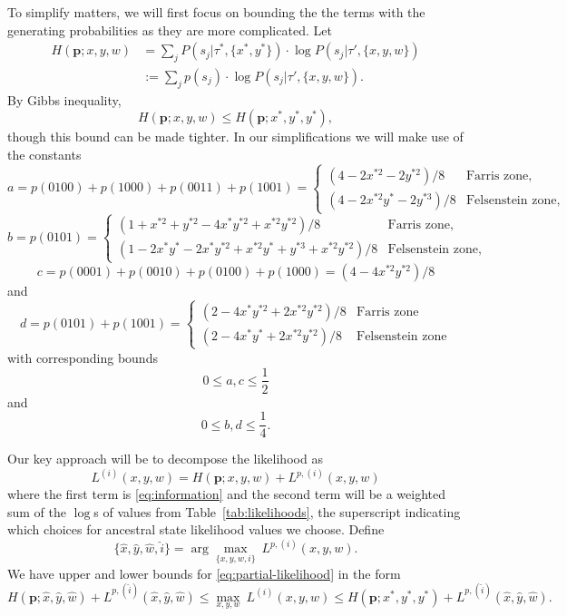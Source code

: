 \documentclass[a4paper]{article}
\begin{document}
To simplify matters, we will first focus on bounding the the terms with the generating probabilities as they are more complicated.
Let
\begin{align}
\label{eq:information}
H(\mathbf{p};x, y, w) &= \sum_{j} P(s_j | \tau^*, \{x^*,y^*\}) \cdot \log P(s_j | \tau', \{x,y,w\}) \nonumber \\ 
&:= \sum_{j} p(s_j) \cdot \log P(s_j | \tau', \{x,y,w\}).
\end{align}
By Gibbs inequality,
$$
H(\mathbf{p};x, y, w) \le H(\mathbf{p};x^*,y^*, y^*),
$$
though this bound can be made tighter.
In our simplifications we will make use of the constants
$$
a = p(0100) + p(1000) + p(0011) + p(1001) = \left\{
	\begin{array}{ll}
		(4-2x^{*2}-2y^{*2})/8  & \mbox{Farris zone,} \\
		(4-2x^{*2}y^{*}-2y^{*3})/8  & \mbox{Felsenstein zone,}
	\end{array}
\right.
$$
$$
b = p(0101) = \left\{
	\begin{array}{ll}
		(1+x^{*2}+y^{*2}-4x^{*}y^{*2}+x^{*2}y^{*2})/8  & \mbox{Farris zone,} \\
		(1-2x^{*}y^{*}-2x^{*}y^{*2}+x^{*2}y^{*}+y^{*3}+x^{*2}y^{*2})/8  & \mbox{Felsenstein zone,}
	\end{array}
\right.
$$
$$
c = p(0001) + p(0010) + p(0100) + p(1000) = (4-4x^{*2}y^{*2})/8
$$
and
$$
d = p(0101) + p(1001) = \left\{
	\begin{array}{ll}
		(2-4x^{*}y^{*2}+2x^{*2}y^{*2})/8  & \mbox{Farris zone} \\
		(2-4x^{*}y^{*}+2x^{*2}y^{*2})/8  & \mbox{Felsenstein zone}
	\end{array}
\right.
$$
with corresponding bounds
$$
0 \le a,c \le \frac{1}{2}
$$
and
$$
0 \le b,d \le \frac{1}{4}.
$$

Our key approach will be to decompose the likelihood as
\begin{equation}
\label{eq:partial-likelihood}
L^{(i)}(x, y, w) = H(\mathbf{p}; x, y, w) + L^{p,(i)}(x,y,w)
\end{equation}
where the first term is \eqref{eq:information} and the second term will be a weighted sum of the $\log$s of values from Table~\ref{tab:likelihoods}, the superscript indicating which choices for ancestral state likelihood values we choose.
Define
$$
\{\hat{x}, \hat{y}, \hat{w}, \hat{i}\} = \arg\max_{\{x,y,w,i\}} \ L^{p,(i)}(x,y,w).
$$
We have upper and lower bounds for \eqref{eq:partial-likelihood} in the form
$$
H(\mathbf{p}; \hat{x}, \hat{y}, \hat{w}) + L^{p,(\hat{i})}(\hat{x}, \hat{y}, \hat{w}) \le \max_{x,y,w} \ L^{(i)}(x,y,w) \le H(\mathbf{p}; x^{*}, y^{*}, y^{*}) + L^{p,(\hat{i})}(\hat{x}, \hat{y}, \hat{w}).
$$
\end{document}
